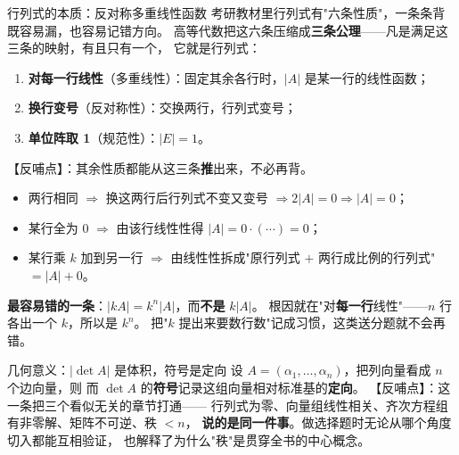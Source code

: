 
\begin{fdeep}{行列式的本质：反对称多重线性函数}
考研教材里行列式有"六条性质"，一条条背既容易漏，也容易记错方向。
高等代数把这六条压缩成\textbf{三条公理}——凡是满足这三条的映射，有且只有一个，
它就是行列式：
\begin{enumerate}[leftmargin=2.2em,itemsep=0.2em]
\item \textbf{对每一行线性}（多重线性）：固定其余各行时，$|A|$ 是某一行的线性函数；
\item \textbf{换行变号}（反对称性）：交换两行，行列式变号；
\item \textbf{单位阵取 1}（规范性）：$|E|=1$。
\end{enumerate}
【反哺点】：其余性质都能从这三条\textbf{推}出来，不必再背。
\begin{itemize}[leftmargin=2.2em,itemsep=0.2em]
\item 两行相同 $\Rightarrow$ 换这两行后行列式不变又变号 $\Rightarrow 2|A|=0\Rightarrow|A|=0$；
\item 某行全为 $0$ $\Rightarrow$ 由该行线性性得 $|A|=0\cdot(\cdots)=0$；
\item 某行乘 $k$ 加到另一行 $\Rightarrow$ 由线性性拆成"原行列式 $+$ 两行成比例的行列式"$=|A|+0$。
\end{itemize}
\textbf{最容易错的一条}：$|kA|=k^{n}|A|$，而\textbf{不是} $k|A|$。
根因就在"对\textbf{每一行}线性"——$n$ 行各出一个 $k$，所以是 $k^{n}$。
把"$k$ 提出来要数行数"记成习惯，这类送分题就不会再错。
\end{fdeep}

\begin{fdeep}{几何意义：$|\det A|$ 是体积，符号是定向}
设 $A=(\alpha_1,\dots,\alpha_n)$，把列向量看成 $n$ 个边向量，则
而 $\det A$ 的\textbf{符号}记录这组向量相对标准基的\textbf{定向}。
【反哺点】：这一条把三个看似无关的章节打通——
行列式为零、向量组线性相关、齐次方程组有非零解、矩阵不可逆、秩 $<n$，
\textbf{说的是同一件事}。做选择题时无论从哪个角度切入都能互相验证，
也解释了为什么"秩"是贯穿全书的中心概念。
\end{fdeep}

